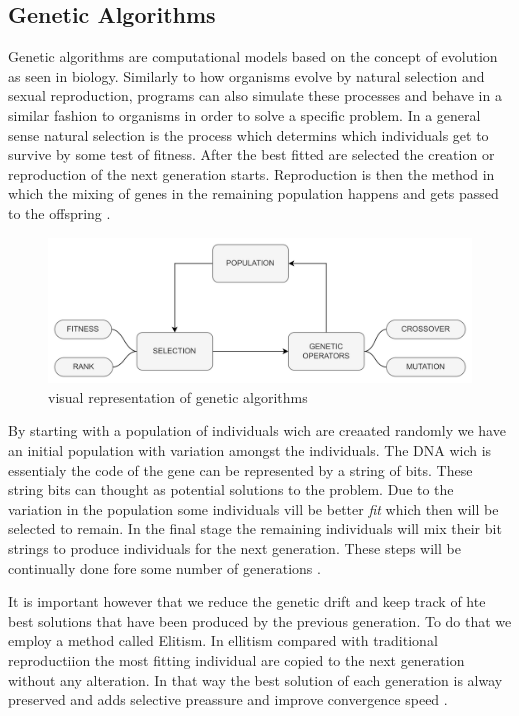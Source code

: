 \subsection{Genetic Algorithms}

Genetic algorithms are computational models based on the concept of evolution as seen in biology. Similarly to how organisms evolve by natural selection and sexual reproduction, programs can also simulate these processes and behave in a similar fashion to organisms in order to solve a specific problem. In a general sense natural selection is the process which determins which individuals get to survive by some test of fitness. After the best fitted are selected the creation or reproduction of the next generation starts. Reproduction is then the method in which the mixing of genes in the remaining population happens and gets passed to the offspring \cite{holland1992genetic}.
\begin{figure}[H]
    \centering
    \includegraphics [scale = 0.08]{Images/GA_graph.png}
    \caption{visual representation of genetic algorithms}
    \label{figGA}
\end{figure}

By starting with a population of individuals wich are creaated randomly we have an initial population with variation amongst the individuals. The DNA wich is essentialy the code of the gene can be represented by a string of bits. These string bits can thought as potential solutions to the problem. Due to the variation in the population some individuals vill be better \textit{fit} which then will be selected to remain. In the final stage the remaining individuals will mix their bit strings to produce individuals for the next generation. These steps will be continually done fore some number of generations \cite{forrest1996genetic}. 

It is important however that we reduce the genetic drift and keep track of hte best solutions that have been produced by the previous generation. To do that we employ a method called Elitism. In ellitism compared with traditional reproductiion the most fitting individual are copied to the next generation without any alteration. In that way the best solution of each generation is alway preserved and adds selective preassure and improve convergence speed \cite{du2018elitism}.
